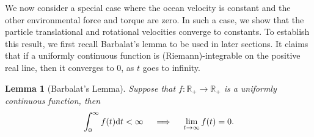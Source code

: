 \documentclass[a4paper,11pt]{article}
\numberwithin{equation}{section}
\newtheorem{lemma}[theorem]{Lemma}
\theoremstyle{definition}
\newcommand{\bbr}{\mathbb R}
\def\d{{  \rm d}}
\begin{document}
We now consider a special case where the ocean velocity is constant and the other environmental force and torque are zero. In such a case, we show that the particle translational and rotational velocities converge to constants. 
To establish this result, we first recall Barbalat's lemma to be used in later sections.
It claims that if a uniformly continuous function is (Riemann)-integrable on the positive real line, then it converges to 0, as $t$ goes to infinity.

\begin{lemma}[Barbalat's Lemma] \label{lem:barb}
Suppose that $f:\bbr_+\to \bbr_+$ is a uniformly continuous function, then
\[
\int_0^\infty f(t)\d t<\infty \quad\implies\quad \lim_{t\to\infty} f(t)=0.
\] 
\end{lemma} 
\end{document}
